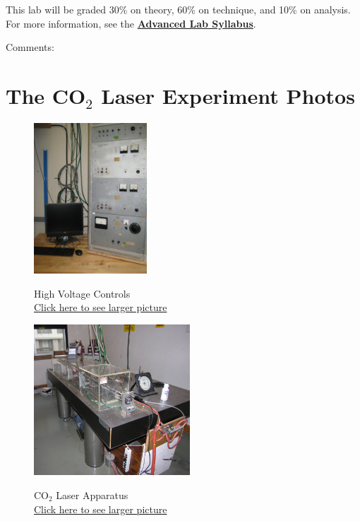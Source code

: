 \documentclass{../lab}
\begin{document}
This lab will be graded 30\% on theory, 60\% on technique, and 10\% on analysis. For more information, see the \href{\AdvancedLabSyllabus}{\textbf{Advanced Lab Syllabus}}.

Comments: \Feedback

\section{The CO\texorpdfstring{$_2$}{2} Laser Experiment Photos}

\begin{figure}[H]
\captionsetup{justification=centering}
\centering
  \href{http://experimentationlab.berkeley.edu/sites/default/files/CO-2/CO2__4082B.jpg}{\includegraphics[height=160pt,keepaspectratio]{images/CO2__4082B.jpg}}
  \caption{High Voltage Controls \\ \href{http://experimentationlab.berkeley.edu/sites/default/files/CO-2/CO2__4082B.jpg}{Click here to see larger picture}}
  \label{fig:HighVoltage}
\endminipage\hfill
{}
\centering
  \href{http://experimentationlab.berkeley.edu/sites/default/files/images/CO2_0687B.jpg}{\includegraphics[height=160pt,keepaspectratio]{images/CO2_0687B.jpg}}
  \caption{CO$_2$ Laser Apparatus \\
  \href{http://experimentationlab.berkeley.edu/sites/default/files/images/CO2_0687B.jpg}{Click here to see larger picture}}
  \label{fig:LaserApparatus}

\end{figure}
\end{document}
